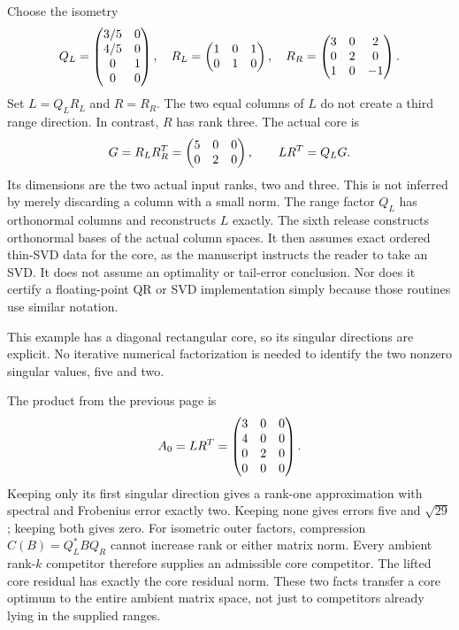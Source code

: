 Choose the isometry
\[
Q_L=\begin{pmatrix}3/5&0\\4/5&0\\0&1\\0&0\end{pmatrix},\quad
R_L=\begin{pmatrix}1&0&1\\0&1&0\end{pmatrix},\quad
R_R=\begin{pmatrix}3&0&2\\0&2&0\\1&0&-1\end{pmatrix}.
\]
Set $L=Q_LR_L$ and $R=R_R$. The two equal columns of $L$ do not create a third range direction. In contrast, $R$ has rank three.
The actual core is
\[
G=R_LR_R^T=\begin{pmatrix}5&0&0\\0&2&0\end{pmatrix},\qquad LR^T=Q_LG.
\]
Its dimensions are the two actual input ranks, two and three. This is not inferred by merely discarding a column with a small norm. The range factor $Q_L$ has orthonormal columns and reconstructs $L$ exactly.
The sixth release constructs orthonormal bases of the actual column spaces. It then assumes exact ordered thin-SVD data for the core, as the manuscript instructs the reader to take an SVD. It does not assume an optimality or tail-error conclusion. Nor does it certify a floating-point QR or SVD implementation simply because those routines use similar notation.

This example has a diagonal rectangular core, so its singular directions are explicit. No iterative numerical factorization is needed to identify the two nonzero singular values, five and two.

The product from the previous page is
\[
A_0=LR^T=\begin{pmatrix}3&0&0\\4&0&0\\0&2&0\\0&0&0\end{pmatrix}.
\]
Keeping only its first singular direction gives a rank-one approximation with spectral and Frobenius error exactly two. Keeping none gives errors five and $\sqrt{29}$; keeping both gives zero.
For isometric outer factors, compression $C(B)=Q_L^*BQ_R$ cannot increase rank or either matrix norm. Every ambient rank-$k$ competitor therefore supplies an admissible core competitor. The lifted core residual has exactly the core residual norm. These two facts transfer a core optimum to the entire ambient matrix space, not just to competitors already lying in the supplied ranges.

